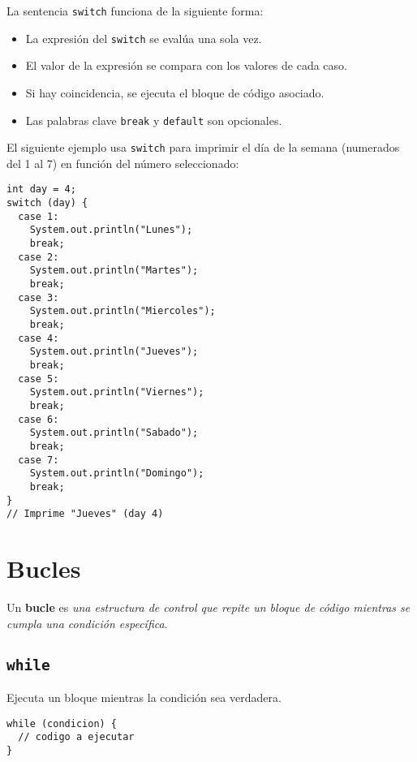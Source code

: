 \documentclass[12pt]{article}
\theoremstyle{largebreak}
\begin{document}
    La sentencia \lstinline|switch| funciona de la siguiente forma:

    \begin{itemize}
        \item La expresión del \lstinline|switch| se evalúa una sola vez.
        \item El valor de la expresión se compara con los valores de cada caso.
        \item Si hay coincidencia, se ejecuta el bloque de código asociado.
        \item Las palabras clave \lstinline|break| y \lstinline|default| son opcionales.
    \end{itemize}

    \begin{exa}
        El siguiente ejemplo usa \lstinline|switch| para imprimir el día de la semana (numerados del 1 al 7) en función del número seleccionado:
        \begin{lstlisting}[caption={Uso de la sentencia \lstinline|switch|.},label=DescriptiveLabel]
int day = 4;
switch (day) {
  case 1:
    System.out.println("Lunes");
    break;
  case 2:
    System.out.println("Martes");
    break;
  case 3:
    System.out.println("Miercoles");
    break;
  case 4:
    System.out.println("Jueves");
    break;
  case 5:
    System.out.println("Viernes");
    break;
  case 6:
    System.out.println("Sabado");
    break;
  case 7:
    System.out.println("Domingo");
    break;
}
// Imprime "Jueves" (day 4)
        \end{lstlisting}
    \end{exa}

    \section{Bucles}

    \begin{mydef}
        Un \textbf{bucle} es \textit{una estructura de control que repite un bloque de código mientras se cumpla una condición específica}.
    \end{mydef}

    \subsection{\lstinline|while|}

    Ejecuta un bloque mientras la condición sea verdadera.

    \begin{lstlisting}[caption={Sintaxis de \lstinline|while|.},label=DescriptiveLabel]
while (condicion) {
  // codigo a ejecutar
}
    \end{lstlisting}
\end{document}
